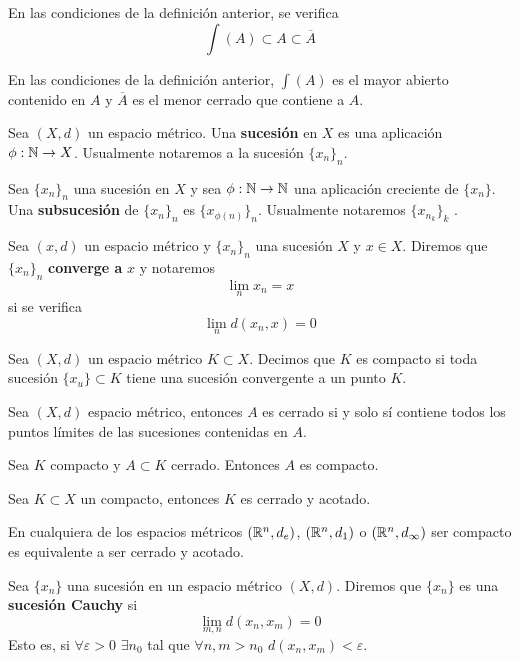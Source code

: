 \documentclass[FyPI.tex]{subfiles}
\begin{document}
\begin{prop}
En las condiciones de la definición anterior, se verifica
$$
\int(A)\subset A \subset \overline{A}
$$
\end{prop}
\begin{ejer}
En las condiciones de la definición anterior, $\int(A)$ es el mayor abierto contenido en $A$ y $\overline{A}$ es el menor cerrado que contiene a $A$.
\end{ejer}
\begin{defi}
Sea $(X,d)$ un espacio métrico. Una \textbf{sucesión} en $X$ es una aplicación $\phi:\mathbb{N}\to X$. Usualmente notaremos a la sucesión $\{x_n\}_n$.
\end{defi}
\begin{defi}
Sea $\{x_n\}_n$ una sucesión en $X$ y sea $\phi:\mathbb{N}\to \mathbb{N}$ una aplicación creciente de $\{x_n\}$. Una \textbf{subsucesión} de $\{x_n\}_n$ es $\{x_{\phi(n)}\}_n$. Usualmente notaremos $\{x_{n_k}\}_k$ . 
\end{defi}
\begin{defi}
Sea $(x,d)$ un espacio métrico y $\{x_n\}_n$ una sucesión $X$ y $x\in X$. Diremos que $\{x_n\}_n$ \textbf{converge a} $x$ y notaremos 
$$
\lim_n x_n = x
$$
si se verifica
$$
\lim_n d(x_n,x) = 0
$$
\end{defi}
\begin{defi} Sea $(X,d)$ un espacio métrico $K\subset X$. Decimos que $K$ es compacto si toda sucesión $\{x_u\}\subset K$ tiene una sucesión convergente a un punto $K$.
\end{defi}
\begin{ejer}
Sea $(X,d)$ espacio métrico, entonces $A$ es cerrado si y solo sí contiene todos los puntos límites de las sucesiones contenidas en $A$.
\end{ejer}
\begin{ejer}
Sea $K$ compacto y $A\subset K$ cerrado. Entonces $A$ es compacto.
\end{ejer}
\begin{ejer}
Sea $K\subset X$ un compacto, entonces $K$ es cerrado y acotado.
\end{ejer}
\begin{theorem}[Heine] En cualquiera de los espacios métricos $(\mathbb{R}^n,d_e)$, $(\mathbb{R}^n,d_1)$ o $(\mathbb{R}^n,d_\infty)$ ser compacto es equivalente a ser cerrado y acotado.
\end{theorem}
\begin{defi}
Sea $\{x_n\}$ una sucesión en un espacio métrico $(X,d)$. Diremos que $\{x_n\}$ es una \textbf{sucesión Cauchy} si 
$$
\lim_{m,n}d(x_n,x_m) = 0
$$ 
Esto es, si $\forall \varepsilon >0$ $\exists n_0$ tal que $\forall n,m>n_0$ $d(x_n,x_m)<\varepsilon$.
\end{defi}
\end{document}
